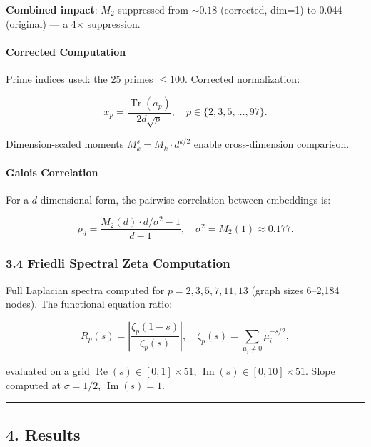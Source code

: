 \documentclass[
]{article}
\begin{document}
\textbf{Combined impact}: \(M_2\) suppressed from \(\sim 0.18\)
(corrected, dim=1) to \(0.044\) (original) --- a 4× suppression.

\hypertarget{corrected-computation}{%
\paragraph{Corrected Computation}\label{corrected-computation}}

Prime indices used: the 25 primes \(\le 100\). Corrected normalization:

\[x_p = \frac{\operatorname{Tr}(a_p)}{2d\sqrt{p}}, \quad p \in \{2,3,5,\dots,97\}.\]

Dimension-scaled moments \(M_k^s = M_k \cdot d^{k/2}\) enable
cross-dimension comparison.

\hypertarget{galois-correlation}{%
\paragraph{Galois Correlation}\label{galois-correlation}}

For a \(d\)-dimensional form, the pairwise correlation between
embeddings is:

\[\rho_d = \frac{M_2(d) \cdot d / \sigma^2 - 1}{d-1}, \quad \sigma^2 = M_2(1) \approx 0.177.\]

\hypertarget{friedli-spectral-zeta-computation}{%
\subsubsection{3.4 Friedli Spectral Zeta
Computation}\label{friedli-spectral-zeta-computation}}

Full Laplacian spectra computed for \(p = 2,3,5,7,11,13\) (graph sizes
6--2,184 nodes). The functional equation ratio:

\[R_p(s) = \left|\frac{\zeta_p(1-s)}{\zeta_p(s)}\right|, \quad \zeta_p(s) = \sum_{\mu_i \neq 0} \mu_i^{-s/2},\]

evaluated on a grid \(\operatorname{Re}(s) \in [0,1] \times 51\),
\(\operatorname{Im}(s) \in [0,10] \times 51\). Slope computed at
\(\sigma = 1/2\), \(\operatorname{Im}(s) = 1\).

\begin{center}\rule{0.5\linewidth}{0.5pt}\end{center}

\hypertarget{results}{%
\subsection{4. Results}\label{results}}
\end{document}
